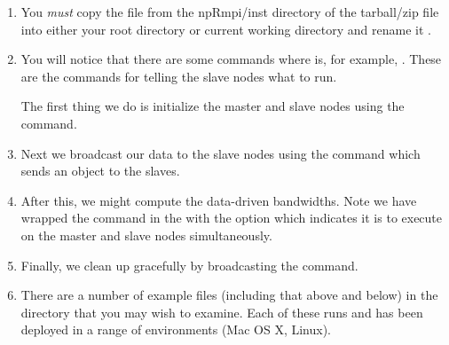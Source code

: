 \documentclass[nojss]{jss}
\begin{document}
\begin{enumerate}
  
  \item You {\em must} copy the  file from the npRmpi/inst
    directory of the tarball/zip file into either your root directory
    or current working directory and rename it . 
    
  \item You will notice that there are some  commands
    where  is, for example, . These are the
     commands for telling the slave nodes what to run.
      
      The first thing we do is initialize the master and slave nodes
      using the  command.
      
    \item Next we broadcast our data to the slave nodes using the
       command which sends an
       object to the slaves.
      
    \item After this, we might compute the data-driven
      bandwidths. Note we have wrapped the  command
       in the  with the option
       which indicates it is to execute on
      the master and slave nodes simultaneously.
      
    \item Finally, we clean up gracefully by broadcasting the
       command.
      
    \item There are a number of example files (including that above
      and below) in the  directory that you may wish
      to examine. Each of these runs and has been deployed in a range
      of environments (Mac OS X, Linux).
        
\end{enumerate}
\end{document}
